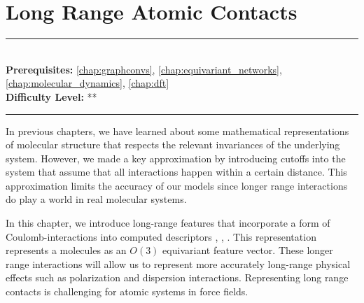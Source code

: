 \documentclass[book.tex]{subfiles}
\begin{document}
\chapter{Long Range Atomic Contacts}


\label{chap:long_range_atomic}
\noindent\rule{11cm}{0.4pt} \\
\textbf{Prerequisites:} \autoref{chap:graphconvs}, \autoref{chap:equivariant_networks}, \autoref{chap:molecular_dynamics},  \autoref{chap:dft} \\
\textbf{Difficulty Level:} ** \\
\noindent\rule{11cm}{0.4pt}
\vspace{5mm}

In  previous chapters, we have learned about some mathematical representations of molecular structure that respects the relevant invariances of the underlying system. However, we made a key approximation by introducing cutoffs into the system that assume that all interactions happen within a certain distance. This approximation limits the accuracy of our models since longer range interactions do play a world in real molecular systems.

In this chapter, we introduce long-range features that incorporate a form of Coulomb-interactions into computed descriptors \cite{grisafi2018symmetry}, \cite{grisafi2018transferable}, \cite{grisafi2019incorporating}. This representation represents a molecules as an $O(3)$ equivariant feature vector. These longer range interactions will allow us to represent more accurately long-range physical effects such as polarization and dispersion interactions.
Representing long range contacts is challenging for atomic systems in force fields. 

\end{document}
